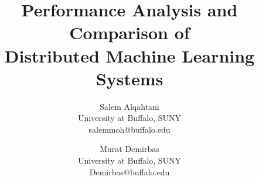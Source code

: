 \documentclass[conference]{IEEEtran}
\begin{document}
%

\title{{\huge Performance Analysis and Comparison of\\ Distributed Machine Learning Systems}}


\author{
Salem Alqahtani\\
University at Buffalo, SUNY\\
salemmoh@buffalo.edu
\and
Murat Demirbas\\
University at Buffalo, SUNY\\
Demirbas@buffalo.edu
}


% 


\end{document}
